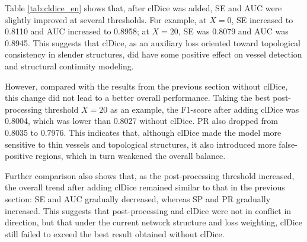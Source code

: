 \documentclass[a4paper,12pt]{article}
\begin{document}
\begin{table}[htbp]
\centering
\caption{Comparison of results under different post-processing thresholds after adding clDice}
\label{tab:cldice_en}
\end{table}

Table \ref{tab:cldice_en} shows that, after clDice was added, SE and AUC were slightly improved at several thresholds. For example, at \(X=0\), SE increased to 0.8110 and AUC increased to 0.8958; at \(X=20\), SE was 0.8079 and AUC was 0.8945. This suggests that clDice, as an auxiliary loss oriented toward topological consistency in slender structures, did have some positive effect on vessel detection and structural continuity modeling.

However, compared with the results from the previous section without clDice, this change did not lead to a better overall performance. Taking the best post-processing threshold \(X=20\) as an example, the F1-score after adding clDice was 0.8004, which was lower than 0.8027 without clDice. PR also dropped from 0.8035 to 0.7976. This indicates that, although clDice made the model more sensitive to thin vessels and topological structures, it also introduced more false-positive regions, which in turn weakened the overall balance.

Further comparison also shows that, as the post-processing threshold increased, the overall trend after adding clDice remained similar to that in the previous section: SE and AUC gradually decreased, whereas SP and PR gradually increased. This suggests that post-processing and clDice were not in conflict in direction, but that under the current network structure and loss weighting, clDice still failed to exceed the best result obtained without clDice.
\end{document}

